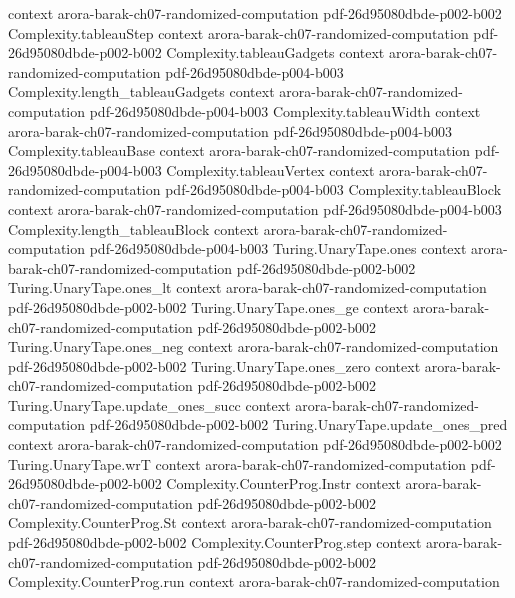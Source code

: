 \begin{theorem}
  {context}
  {arora-barak-ch07-randomized-computation}
  {pdf-26d95080dbde-p002-b002}
\proofstep
  {Complexity.tableauStep}
  {context}
  {arora-barak-ch07-randomized-computation}
  {pdf-26d95080dbde-p002-b002}
\proofstep
  {Complexity.tableauGadgets}
  {context}
  {arora-barak-ch07-randomized-computation}
  {pdf-26d95080dbde-p004-b003}
\proofstep
  {Complexity.length_tableauGadgets}
  {context}
  {arora-barak-ch07-randomized-computation}
  {pdf-26d95080dbde-p004-b003}
\proofstep
  {Complexity.tableauWidth}
  {context}
  {arora-barak-ch07-randomized-computation}
  {pdf-26d95080dbde-p004-b003}
\proofstep
  {Complexity.tableauBase}
  {context}
  {arora-barak-ch07-randomized-computation}
  {pdf-26d95080dbde-p004-b003}
\proofstep
  {Complexity.tableauVertex}
  {context}
  {arora-barak-ch07-randomized-computation}
  {pdf-26d95080dbde-p004-b003}
\proofstep
  {Complexity.tableauBlock}
  {context}
  {arora-barak-ch07-randomized-computation}
  {pdf-26d95080dbde-p004-b003}
\proofstep
  {Complexity.length_tableauBlock}
  {context}
  {arora-barak-ch07-randomized-computation}
  {pdf-26d95080dbde-p004-b003}
\proofstep
  {Turing.UnaryTape.ones}
  {context}
  {arora-barak-ch07-randomized-computation}
  {pdf-26d95080dbde-p002-b002}
\proofstep
  {Turing.UnaryTape.ones_lt}
  {context}
  {arora-barak-ch07-randomized-computation}
  {pdf-26d95080dbde-p002-b002}
\proofstep
  {Turing.UnaryTape.ones_ge}
  {context}
  {arora-barak-ch07-randomized-computation}
  {pdf-26d95080dbde-p002-b002}
\proofstep
  {Turing.UnaryTape.ones_neg}
  {context}
  {arora-barak-ch07-randomized-computation}
  {pdf-26d95080dbde-p002-b002}
\proofstep
  {Turing.UnaryTape.ones_zero}
  {context}
  {arora-barak-ch07-randomized-computation}
  {pdf-26d95080dbde-p002-b002}
\proofstep
  {Turing.UnaryTape.update_ones_succ}
  {context}
  {arora-barak-ch07-randomized-computation}
  {pdf-26d95080dbde-p002-b002}
\proofstep
  {Turing.UnaryTape.update_ones_pred}
  {context}
  {arora-barak-ch07-randomized-computation}
  {pdf-26d95080dbde-p002-b002}
\proofstep
  {Turing.UnaryTape.wrT}
  {context}
  {arora-barak-ch07-randomized-computation}
  {pdf-26d95080dbde-p002-b002}
\proofstep
  {Complexity.CounterProg.Instr}
  {context}
  {arora-barak-ch07-randomized-computation}
  {pdf-26d95080dbde-p002-b002}
\proofstep
  {Complexity.CounterProg.St}
  {context}
  {arora-barak-ch07-randomized-computation}
  {pdf-26d95080dbde-p002-b002}
\proofstep
  {Complexity.CounterProg.step}
  {context}
  {arora-barak-ch07-randomized-computation}
  {pdf-26d95080dbde-p002-b002}
\proofstep
  {Complexity.CounterProg.run}
  {context}
  {arora-barak-ch07-randomized-computation}

\end{theorem}
